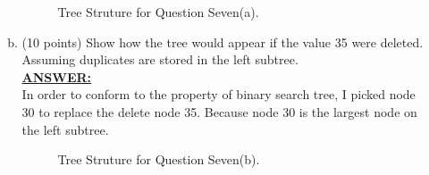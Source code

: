 \documentclass{article}
\newcommand{\answer}{\textbf{\\\underline{ANSWER:}\\}}
\begin{document}
\begin{enumerate}
\begin{enumerate}[(a)]
\begin{figure}[H]
  \begin{center}
    \caption{Tree Struture for Question Seven(a).\label{fig:bst_visit}}
    \vspace{-15pt}
  \end{center}
\end{figure}

\item (10 points)  Show how the tree would appear if the value 35 were
deleted. Assuming duplicates are stored in the left subtree. 
\answer In order to conform to the property of binary search tree, I
picked node 30 to replace the delete node 35. Because node 30 is the
largest node on the left subtree. 
\begin{figure}[H]
  \begin{center}
    \caption{Tree Struture for Question Seven(b).\label{fig:bst_delete}}
    \vspace{-15pt}
  \end{center}
\end{figure}
\end{enumerate}


\end{enumerate}
\end{document}
